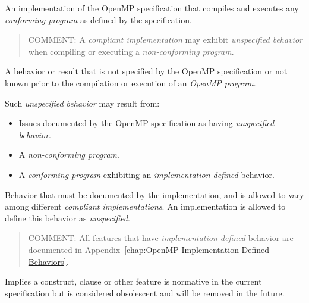 \glossarydefstart
An implementation of the OpenMP specification that compiles and executes any 
\emph{conforming program} as defined by the specification.

\begin{quote}
COMMENT: A \emph{compliant implementation} may exhibit \emph{unspecified behavior} when 
compiling or executing a \emph{non-conforming program}.
\end{quote}
\glossarydefend

\glossarydefstart
A behavior or result that is not specified by the OpenMP specification or not 
known prior to the compilation or execution of an \emph{OpenMP program}.

Such \emph{unspecified behavior} may result from:

\begin{itemize}
\item Issues documented by the OpenMP specification as having \emph{unspecified 
behavior}.

\item A \emph{non-conforming program}.

\item A \emph{conforming program} exhibiting an \emph{implementation defined} behavior.
\end{itemize}
\glossarydefend

\glossarydefstart
Behavior that must be documented by the implementation, and is allowed to vary 
among different \emph{compliant implementations}. An implementation is allowed to 
define this behavior as \emph{unspecified}.

\begin{quote}
COMMENT: All features that have \emph{implementation defined} behavior 
are documented in Appendix~\ref{chap:OpenMP Implementation-Defined Behaviors}.
\end{quote}
\glossarydefend

\glossarydefstart
Implies a construct, clause or other feature is normative in the current specification but is considered obsolescent and will be removed in the future.
\glossarydefend








